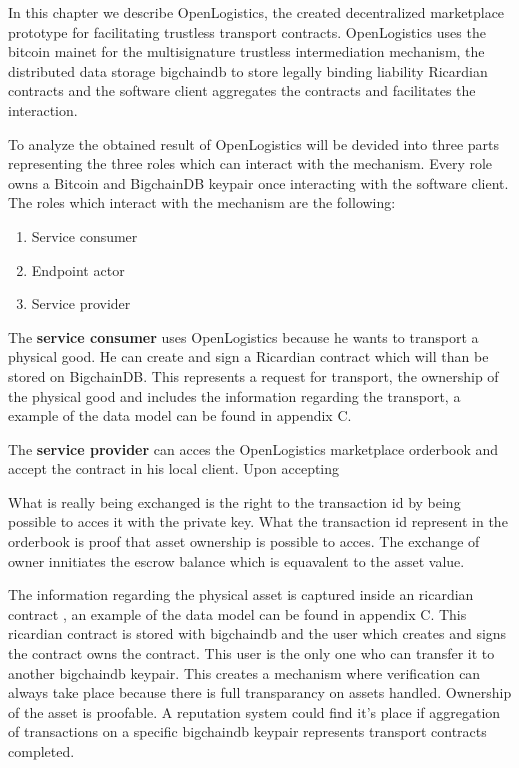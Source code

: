 In this chapter we describe OpenLogistics, the created decentralized  marketplace prototype for facilitating trustless transport contracts. OpenLogistics uses the bitcoin mainet for the multisignature trustless intermediation mechanism, the distributed data storage bigchaindb to store legally binding liability Ricardian contracts and the software client aggregates the contracts and facilitates the interaction. \par
To analyze the obtained result of OpenLogistics will be devided into three parts representing the three roles which can interact with the mechanism. Every role owns a Bitcoin and BigchainDB keypair once interacting with the software client. The roles which interact with the mechanism are the following:
\begin{enumerate}
  \item Service consumer
  \item Endpoint actor
  \item Service provider
\end{enumerate}
The \textbf{service consumer} uses OpenLogistics because he wants to transport a physical good. He can create and sign a Ricardian contract which will than be stored on BigchainDB. This represents a request for transport, the ownership of the physical good and includes the information regarding the transport, a example of the data model can be found in appendix C. \par
The \textbf{service provider} can acces the OpenLogistics marketplace orderbook and accept the contract in his local client. Upon accepting

What is really being exchanged is the right to the transaction id by being possible to acces it with the private key. What the transaction id represent in the orderbook is proof that asset ownership is possible to acces. The exchange of owner innitiates the escrow balance which is equavalent to the asset value.

The information regarding the physical asset is captured inside an ricardian contract \cite{}, an example of the data model can be found in appendix C. This ricardian contract is stored with bigchaindb and the user which creates and signs the contract owns the contract. This user is the only one who can transfer it to another bigchaindb keypair. This creates a mechanism where verification can always take place because there is full transparancy on assets handled. Ownership of the asset is proofable. A reputation system could find it's place if aggregation of transactions on a specific bigchaindb keypair represents transport contracts completed.

